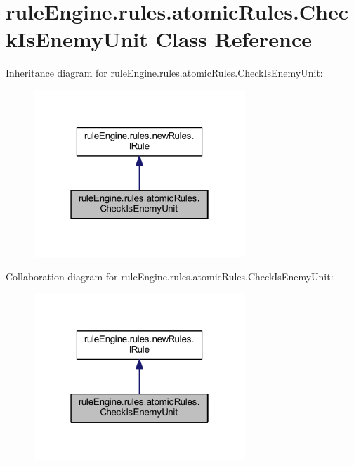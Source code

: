 \hypertarget{classrule_engine_1_1rules_1_1atomic_rules_1_1_check_is_enemy_unit}{}\section{rule\+Engine.\+rules.\+atomic\+Rules.\+Check\+Is\+Enemy\+Unit Class Reference}
\label{classrule_engine_1_1rules_1_1atomic_rules_1_1_check_is_enemy_unit}


Inheritance diagram for rule\+Engine.\+rules.\+atomic\+Rules.\+Check\+Is\+Enemy\+Unit\+:
\nopagebreak
\begin{figure}[H]
\begin{center}
\leavevmode
\includegraphics[width=226pt]{classrule_engine_1_1rules_1_1atomic_rules_1_1_check_is_enemy_unit__inherit__graph}
\end{center}
\end{figure}


Collaboration diagram for rule\+Engine.\+rules.\+atomic\+Rules.\+Check\+Is\+Enemy\+Unit\+:
\nopagebreak
\begin{figure}[H]
\begin{center}
\leavevmode
\includegraphics[width=226pt]{classrule_engine_1_1rules_1_1atomic_rules_1_1_check_is_enemy_unit__coll__graph}
\end{center}
\end{figure}

